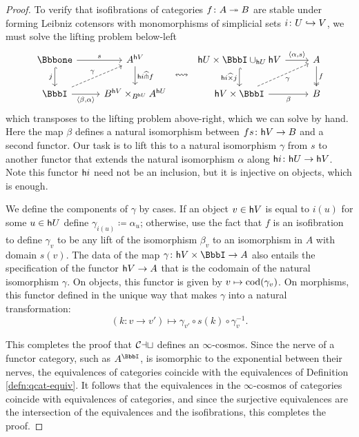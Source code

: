 \begin{proof}
To verify that isofibrations of categories $f \colon A \twoheadrightarrow B$ are stable under forming Leibniz cotensors with monomorphisms of simplicial sets $i \colon U \hookrightarrow V$, we must solve the lifting problem below-left
\[
\begin{tikzcd} \catone \arrow[r, "s"] \arrow[d, hook, "j"'] & A^{\ho{V}} \arrow[d, "{\ho{i}\leib\pwr f}"] \arrow[dr, phantom, "\leftrightsquigarrow"] & \ho{U} \times \iso \cup_{\ho{U}} \ho{V} \arrow[r, "{\langle \alpha, s\rangle}"] \arrow[d, hook, "\ho{i} \leib\times j"'] & A \arrow[d, two heads, "f"] \\ \iso \arrow[ur, dashed, "\gamma"] \arrow[r, "{\langle \beta, \alpha \rangle}"'] & B^{\ho V} \times_{B^{\ho U}} A^{\ho U} & \ho{V} \times \iso \arrow[r, "\beta"'] \arrow[ur, dashed, "\gamma"'] & B
\end{tikzcd}
\]
which transposes to the lifting problem above-right, which we can solve by hand. Here the map $\beta$ defines a natural isomorphism between $fs \colon {\mathord{\mathsf{h}}}{V} \to B$ and a second functor. Our task is to lift this to a natural isomorphism $\gamma$ from $s$ to another functor that extends the natural isomorphism $\alpha$ along ${\mathord{\mathsf{h}}}{i} \colon {\mathord{\mathsf{h}}}{U} \to {\mathord{\mathsf{h}}}{V}$. Note this functor ${\mathord{\mathsf{h}}}{i}$ need not be an inclusion, but it is injective on objects, which is enough.

We define the components of $\gamma$ by cases. If an object $v \in {\mathord{\mathsf{h}}}{V}$ is equal to $i(u)$ for some $u \in {\mathord{\mathsf{h}}}{U}$ define $\gamma_{i(u)} \coloneq \alpha_u$; otherwise, use the fact that $f$ is an isofibration to define $\gamma_v$ to be any lift of the isomorphism $\beta_v$ to an isomorphism in $A$ with domain $s(v)$. The data of the map $\gamma \colon \ho{V} \times \iso \to A$ also entails the specification of the functor ${\mathord{\mathsf{h}}}{V} \to A$ that is the codomain of the natural isomorphism $\gamma$. On objects, this functor is given by $v \mapsto \textup{cod}(\gamma_v)$. On morphisms, this functor defined in the unique way that makes $\gamma$ into a natural transformation:
\[  (k \colon v \to v') \mapsto  \gamma_{v'} \circ s(k) \circ \gamma_v^{-1}.\]

This completes the proof that ${\mathord{\mathcal{Cat}}}$ defines an $\infty$-cosmos. Since the nerve of a functor category, such as $A^\iso$, is isomorphic to the exponential between their nerves, the equivalences of categories coincide with the equivalences of Definition \ref{defn:qcat-equiv}. It follows that the equivalences in the $\infty$-cosmos of categories coincide with equivalences of categories, and since the surjective equivalences are the intersection of the equivalences and the isofibrations, this completes the proof.
\end{proof}

